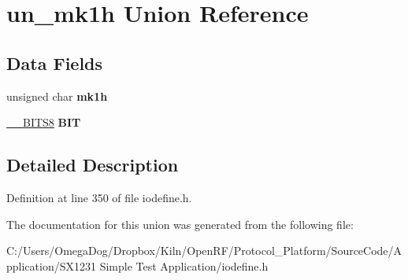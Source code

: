 \hypertarget{unionun__mk1h}{\section{un\-\_\-mk1h Union Reference}
\label{unionun__mk1h}
}
\subsection*{Data Fields}
\begin{DoxyCompactItemize}
\item 
\hypertarget{unionun__mk1h_a145b1b9730f7a198419ddf7738bba83d}{unsigned char {\bfseries mk1h}}\label{unionun__mk1h_a145b1b9730f7a198419ddf7738bba83d}

\item 
\hypertarget{unionun__mk1h_abaddfd7997bd7f28b9c1339d8e5bc1f8}{\hyperlink{struct_____b_i_t_s8}{\-\_\-\-\_\-\-B\-I\-T\-S8} {\bfseries B\-I\-T}}\label{unionun__mk1h_abaddfd7997bd7f28b9c1339d8e5bc1f8}

\end{DoxyCompactItemize}


\subsection{Detailed Description}


Definition at line 350 of file iodefine.\-h.



The documentation for this union was generated from the following file\-:\begin{DoxyCompactItemize}
\item 
C\-:/\-Users/\-Omega\-Dog/\-Dropbox/\-Kiln/\-Open\-R\-F/\-Protocol\-\_\-\-Platform/\-Source\-Code/\-Application/\-S\-X1231 Simple Test Application/iodefine.\-h\end{DoxyCompactItemize}
